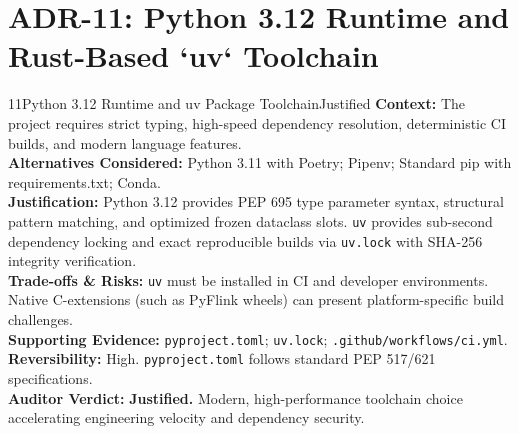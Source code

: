 \documentclass[10pt,a4paper]{report}
\begin{document}
\section{ADR-11: Python 3.12 Runtime and Rust-Based `uv` Toolchain}
\begin{adrbox}{11}{Python 3.12 Runtime and uv Package Toolchain}{Justified}
\textbf{Context:} The project requires strict typing, high-speed dependency resolution, deterministic CI builds, and modern language features.\\
\textbf{Alternatives Considered:} Python 3.11 with Poetry; Pipenv; Standard pip with requirements.txt; Conda.\\
\textbf{Justification:} Python 3.12 provides PEP 695 type parameter syntax, structural pattern matching, and optimized frozen dataclass slots. \texttt{uv} provides sub-second dependency locking and exact reproducible builds via \texttt{uv.lock} with SHA-256 integrity verification.\\
\textbf{Trade-offs \& Risks:} \texttt{uv} must be installed in CI and developer environments. Native C-extensions (such as PyFlink wheels) can present platform-specific build challenges.\\
\textbf{Supporting Evidence:} \texttt{pyproject.toml}; \texttt{uv.lock}; \texttt{.github/workflows/ci.yml}.\\
\textbf{Reversibility:} High. \texttt{pyproject.toml} follows standard PEP 517/621 specifications.\\
\textbf{Auditor Verdict:} \textbf{Justified.} Modern, high-performance toolchain choice accelerating engineering velocity and dependency security.
\end{adrbox}
\end{document}
